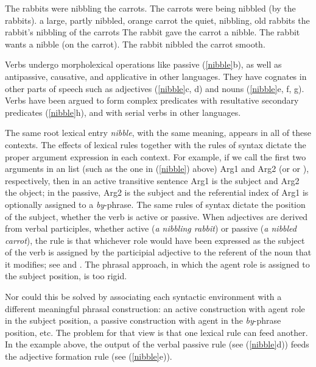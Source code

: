 \documentclass[output=paper
	        ,collection
	        ,collectionchapter
 	        ,biblatex
                ,babelshorthands
                ,newtxmath
                ,draftmode
                ,colorlinks, citecolor=brown
]{langscibook}
\begin{document}
\begin{exe}
\ex \label{nibble}
\begin{xlist}
\ex  The rabbits were nibbling the carrots.  
\ex  The carrots were being nibbled (by the rabbits).
\ex  a large, partly nibbled, orange carrot 
\ex  the quiet, nibbling, old rabbits
\ex  the rabbit's nibbling of the carrots
\ex  The rabbit gave the carrot a nibble.  
\ex  The rabbit wants a nibble (on the carrot).  
\ex  The rabbit nibbled the carrot smooth.
\end{xlist}
\end{exe}

\noindent
Verbs undergo  morpholexical operations like passive
(\ref{nibble}b), as well as antipassive, causative, and applicative in other languages.  They have cognates in
other parts of speech such as adjectives  (\ref{nibble}c, d) and nouns  (\ref{nibble}e, f, g).  
Verbs have been argued to form complex predicates with resultative secondary predicates (\ref{nibble}h), and with serial verbs in other languages.   

The same root lexical entry \emph{nibble}, with the same meaning, appears in all of these contexts.
The effects of lexical rules together with the rules of syntax dictate the proper argument
expression in each context.  For example, if we call the first two arguments in an \argst list
(such as the one in (\ref{nibble}) above) Arg1 and Arg2 (or  or ), respectively, then in an active
transitive sentence Arg1 is the subject and Arg2 the object; in the passive, Arg2 is the subject and
the referential index of Arg1 is optionally assigned to a \emph{by}-phrase.  The same rules of
syntax dictate the position of the subject, whether the verb is active or passive.  When adjectives
are derived from verbal participles, whether active (\emph{a nibbling rabbit}) or passive (\emph{a
  nibbled carrot}), the rule is that whichever role would have been expressed as the subject of the
verb is assigned by the participial adjective to the referent of the noun that it modifies; see \citet{Bresnan:1982passive} 
and \citet[Chapter~3]{Bresnan+etal:2015}.  
The phrasal approach, in which the agent role is assigned to the subject position, is too rigid.  

Nor could this be solved by associating each syntactic environment with a different meaningful phrasal construction: an active construction with agent role in the subject position, a passive construction with agent in the \textit{by}-phrase position, etc.  The problem for that view is that one lexical rule can feed another.  In the example above, the output of the verbal passive rule (see (\ref{nibble}d)) feeds the adjective formation rule (see (\ref{nibble}e)).  
 
\end{document}
